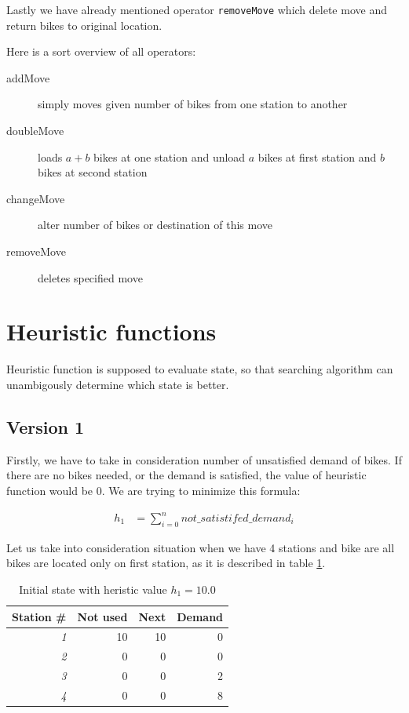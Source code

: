 \documentclass[11pt,twoside,a4paper]{mr}%
\begin{document}
Lastly we have already mentioned operator \texttt{removeMove} which delete move and return bikes to original location.

Here is a sort overview of all operators:
\begin{description}
 \item[addMove] simply moves given number of bikes from one station to another
\item[doubleMove] loads \( a + b \) bikes at one station and unload \(a\) bikes at first station and \(b\) bikes at second station
\item[changeMove] alter number of bikes or destination of this move
\item[removeMove] deletes specified move
 \end{description}

\section{Heuristic functions}
Heuristic function is supposed to evaluate state, so that searching algorithm can unambigously determine which state is better. 

\subsection*{Version 1}
Firstly, we have to take in consideration number of unsatisfied demand of bikes. If there are no bikes needed, or the demand is satisfied, the value of heuristic function would be 0. We are trying to minimize this formula: 

\begin{align}
 h_1 &=\sum\limits_{i=0}^{n} not\_satistifed\_demand_i
\end{align}

Let us take into consideration situation when we have 4 stations and bike are all bikes are located only on first station, as it is described in table \ref{t:ex1a}.


\begin{table}[!t]
\renewcommand{\arraystretch}{1.1}
\label{t:ex1a}
\begin{center}
\begin{tabular}[t]{|r|r|r|r|}
\hline
\bf Station \# & \bf Not used & \bf Next &\bf Demand\\ \hline\hline
\sl1 & 10 & 10 & 0\\ \hline
\sl2 & 0 & 0 & 0\\ \hline
\sl3 & 0 & 0 & 2\\ \hline
\sl4 & 0 & 0 & 8\\ \hline
\end{tabular}
\end{center}

\caption{Initial state with heristic value \(h_1= 10.0\)}
\end{table}
\end{document}
